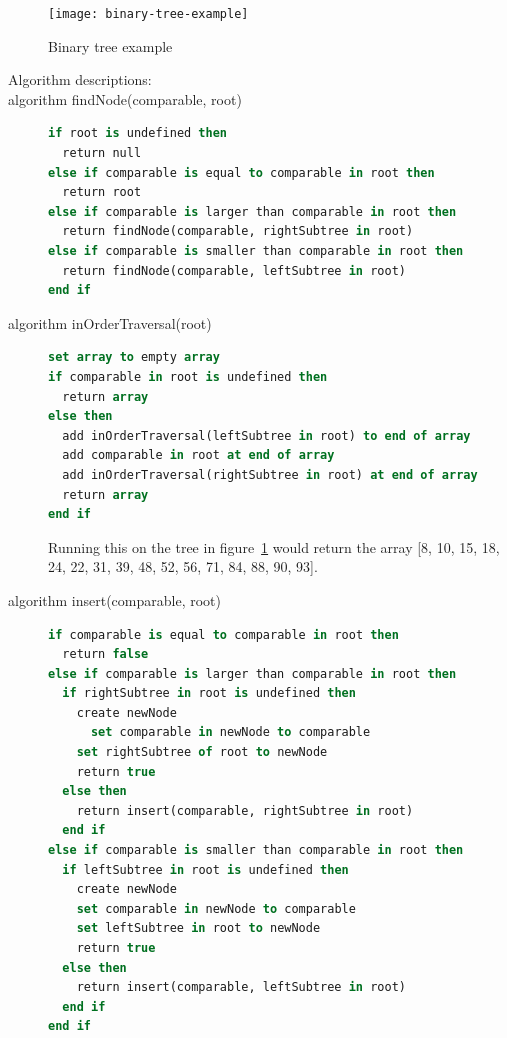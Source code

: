 \documentclass {article}
\begin{document}
\begin{figure}[H]
\texttt{[image: binary-tree-example]}


\caption {Binary tree example}
\label{fig:binary-tree-example}
\end {figure}

\begin{description}
\item[Algorithm descriptions:]
\item [algorithm findNode(comparable, root)]
\item[]
\begin{lstlisting}[language=Pascal]
if root is undefined then
  return null
else if comparable is equal to comparable in root then
  return root
else if comparable is larger than comparable in root then
  return findNode(comparable, rightSubtree in root)
else if comparable is smaller than comparable in root then
  return findNode(comparable, leftSubtree in root)
end if
\end{lstlisting}

\item [algorithm inOrderTraversal(root)]
\item []
\begin{lstlisting}[language=Pascal]
set array to empty array
if comparable in root is undefined then
  return array
else then
  add inOrderTraversal(leftSubtree in root) to end of array
  add comparable in root at end of array
  add inOrderTraversal(rightSubtree in root) at end of array
  return array
end if
\end{lstlisting}

\item[] Running this on the tree in figure~\ref{fig:binary-tree-example} would return the array [8, 10, 15, 18, 24, 22, 31, 39, 48, 52, 56, 71, 84, 88, 90, 93].

\item [algorithm insert(comparable, root)]
\item []
\begin{lstlisting}[language=Pascal]
if comparable is equal to comparable in root then
  return false
else if comparable is larger than comparable in root then
  if rightSubtree in root is undefined then
    create newNode
	  set comparable in newNode to comparable
    set rightSubtree of root to newNode
    return true
  else then
    return insert(comparable, rightSubtree in root)
  end if
else if comparable is smaller than comparable in root then
  if leftSubtree in root is undefined then 
    create newNode
    set comparable in newNode to comparable
    set leftSubtree in root to newNode
    return true
  else then
    return insert(comparable, leftSubtree in root)
  end if
end if
\end{lstlisting}
\end{description}
\end{document}
